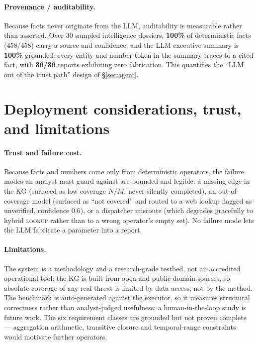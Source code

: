 \documentclass[review]{elsarticle}
\newcommand{\op}[1]{\textsc{\small #1}}
\begin{document}
\paragraph{Provenance / auditability.} Because facts never originate from the
LLM, auditability is measurable rather than asserted. Over 30 sampled
intelligence dossiers, \textbf{100\%} of deterministic facts (458/458) carry a
source and confidence, and the LLM executive summary is \textbf{100\%} grounded:
every entity and number token in the summary traces to a cited fact, with
\textbf{30/30} reports exhibiting zero fabrication. This quantifies the ``LLM
out of the trust path'' design of \S\ref{sec:agent}.

\section{Deployment considerations, trust, and limitations}
\label{sec:deploy}

\paragraph{Trust and failure cost.}
Because facts and numbers come only from deterministic operators, the failure
modes an analyst must guard against are bounded and legible: a missing edge in
the KG (surfaced as low coverage $N/M$, never silently completed), an
out-of-coverage model (surfaced as ``not covered'' and routed to a web lookup
flagged as unverified, confidence 0.6), or a dispatcher misroute (which
degrades gracefully to hybrid \op{lookup} rather than to a wrong operator's
empty set). No failure mode lets the LLM fabricate a parameter into a report.

\paragraph{Limitations.}
The system is a methodology and a research-grade testbed, not an accredited
operational tool: the KG is built from open and public-domain sources, so
absolute coverage of any real threat is limited by data access, not by the
method. The benchmark is auto-generated against the executor, so it measures
structural correctness rather than analyst-judged usefulness; a
human-in-the-loop study is future work. The six requirement classes are
grounded but not proven complete --- aggregation arithmetic, transitive
closure and temporal-range constraints would motivate further operators.
\end{document}
